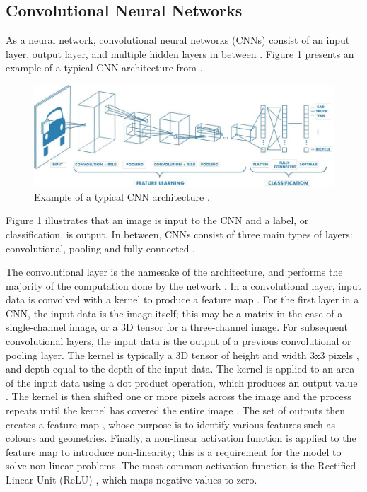 \subsection{Convolutional Neural Networks}

As a neural network, convolutional neural networks (CNNs) consist of an input layer, output layer, and multiple hidden layers in between \cite{mathworks_2017}. Figure \ref{fig:convnet} presents an example of a typical CNN architecture from \cite{mathworks_2017}.

\begin{figure}[ht]
  \centering
  \includegraphics[width=\textwidth]{images/q2_convnet.jpg}
  \caption{Example of a typical CNN architecture \cite{mathworks_2017}.}
  \label{fig:convnet}
\end{figure}

Figure \ref{fig:convnet} illustrates that an image is input to the CNN and a label, or classification, is output. In between, CNNs consist of three main types of layers: convolutional, pooling and fully-connected \cite{ibm_2020}.

The convolutional layer is the namesake of the architecture, and performs the majority of the computation done by the network \cite{ibm_2020}. In a convolutional layer, input data is convolved with a kernel to produce a feature map \cite{ibm_2020}. For the first layer in a CNN, the input data is the image itself; this may be a matrix in the case of a single-channel image, or a 3D tensor for a three-channel image. For subsequent convolutional layers, the input data is the output of a previous convolutional or pooling layer. The kernel is typically a 3D tensor of height and width 3x3 pixels \cite{ibm_2020}, and depth equal to the depth of the input data. The kernel is applied to an area of the input data using a dot product operation, which produces an output value \cite{ibm_2020}. The kernel is then shifted one or more pixels across the image and the process repeats until the kernel has covered the entire image \cite{ibm_2020}. The set of outputs then creates a feature map \cite{ibm_2020}, whose purpose is to identify various features such as colours and geometries. Finally, a non-linear activation function is applied to the feature map to introduce non-linearity; this is a requirement for the model to solve non-linear problems. The most common activation function is the Rectified Linear Unit (ReLU) \cite{ibm_2020}, which maps negative values to zero.

